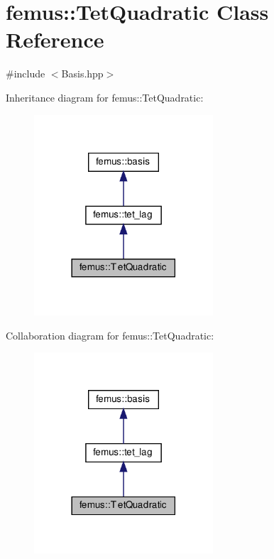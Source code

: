 \hypertarget{classfemus_1_1_tet_quadratic}{}\section{femus\+:\+:Tet\+Quadratic Class Reference}
\label{classfemus_1_1_tet_quadratic}


{\ttfamily \#include $<$Basis.\+hpp$>$}



Inheritance diagram for femus\+:\+:Tet\+Quadratic\+:
\nopagebreak
\begin{figure}[H]
\begin{center}
\leavevmode
\includegraphics[width=189pt]{classfemus_1_1_tet_quadratic__inherit__graph}
\end{center}
\end{figure}


Collaboration diagram for femus\+:\+:Tet\+Quadratic\+:
\nopagebreak
\begin{figure}[H]
\begin{center}
\leavevmode
\includegraphics[width=189pt]{classfemus_1_1_tet_quadratic__coll__graph}
\end{center}
\end{figure}
